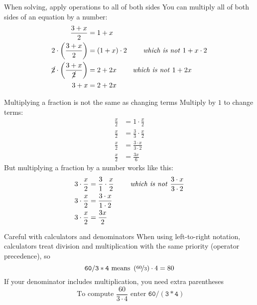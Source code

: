\begin{WarningBox}{When solving, apply operations to all of both sides}
 You can multiply all of both sides of an equation by a number:
 \begin{equation*}
  \begin{split}
    \frac{3 + x}{2}
    &= 1 + x
    \\
    2 \cdot \left(\frac{3 + x}{2}\right)
    &= \left(1 + x\right) \cdot 2
      \qquad \text{ \emph{which is not} } 1 + x \cdot 2
    \\
    \cancel{2} \cdot \left(\frac{3 + x}{\cancel{2}}\right)
    &= 2 + 2x
      \qquad \text{ \emph{which is not} } 1 + 2x
    \\
    3 + x &= 2 + 2x
  \end{split}
 \end{equation*}
\end{WarningBox}
\begin{WarningBox}{Multiplying a fraction is not the same as changing terms}
 Multiply by $1$ to change terms:
 \begin{equation*}
  \begin{split}
    \frac{x}{2} &= 1 \cdot \frac{x}{2}
    \\
    \frac{x}{2} &= \frac{3}{3} \cdot \frac{x}{2}
    \\
    \frac{x}{2} &= \frac{3 \cdot x}{3 \cdot 2}
    \\
    \frac{x}{2} &= \frac{3x}{6}
  \end{split}
 \end{equation*}
 But multiplying a fraction by a number works like this:
 \begin{equation*}
  \begin{split}
    3 \cdot \frac{x}{2} &= \frac{3}{1} \cdot \frac{x}{2}
      \qquad \text{ \emph{which is not} } \frac{3 \cdot x}{3 \cdot 2}
    \\
    3 \cdot \frac{x}{2} &= \frac{3 \cdot x}{1 \cdot 2}
    \\
    3 \cdot \frac{x}{2} &= \frac{3x}{2}
  \end{split}
 \end{equation*}
\end{WarningBox}
\begin{WarningBox}{Careful with calculators and denominators}
 When using left-to-right notation, calculators treat division and multiplication with the same priority (operator precedence), so
 \begin{equation*}
  \mathtt{60 / 3 * 4}
  \text{ means }
  \left(\nicefrac{60}{3}\right) \cdot 4
  = 80
 \end{equation*}
 If your denominator includes multiplication, you need extra parentheses
 \begin{equation*}
  \text{ To compute }
  \frac{60}{3 \cdot 4}
  \text{ enter }
  \mathtt{60 / (3 * 4)}
 \end{equation*}
\end{WarningBox}

